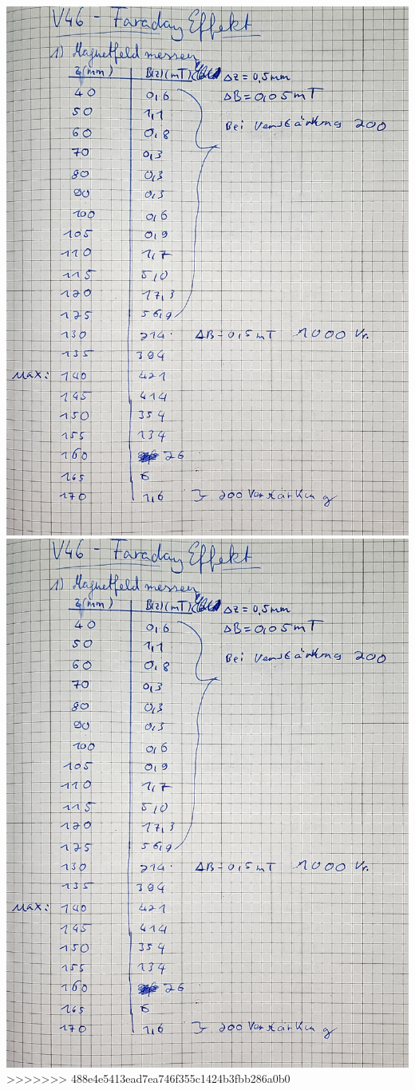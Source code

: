 \includegraphics[width=\textwidth,page=2]{Bilder/v46originaldaten.pdf}
\includegraphics[width=\textwidth,page=3]{Bilder/v46originaldaten.pdf}
>>>>>>> 488e4e5413ead7ea746f355c1424b3fbb286a0b0
